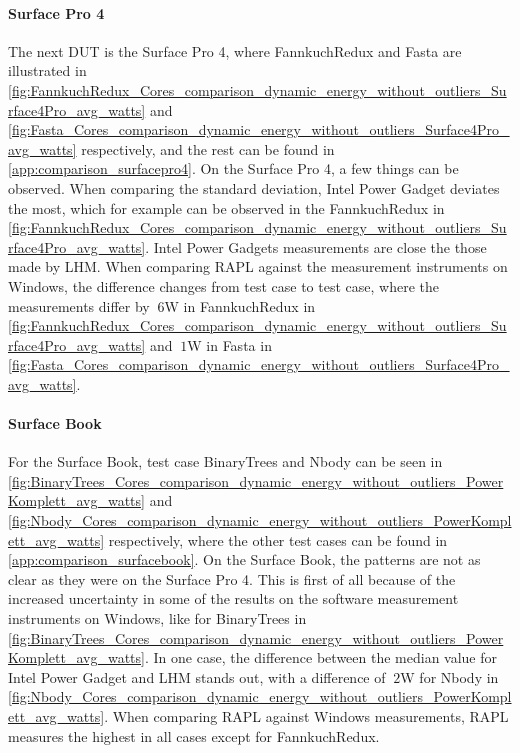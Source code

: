 \paragraph{Surface Pro 4}




The next DUT is the Surface Pro 4, where FannkuchRedux and Fasta are illustrated in \cref{fig:FannkuchRedux_Cores_comparison_dynamic_energy_without_outliers_Surface4Pro_avg_watts} and \cref{fig:Fasta_Cores_comparison_dynamic_energy_without_outliers_Surface4Pro_avg_watts} respectively, and the rest can be found in \cref{app:comparison_surfacepro4}. On the Surface Pro 4, a few things can be observed. When comparing the standard deviation, Intel Power Gadget deviates the most, which for example can be observed in the FannkuchRedux in \cref{fig:FannkuchRedux_Cores_comparison_dynamic_energy_without_outliers_Surface4Pro_avg_watts}. Intel Power Gadgets measurements are close the those made by LHM. When comparing RAPL against the measurement instruments on Windows, the difference changes from test case to test case,  where the measurements differ by $~6$W in FannkuchRedux in \cref{fig:FannkuchRedux_Cores_comparison_dynamic_energy_without_outliers_Surface4Pro_avg_watts} and $~1$W in Fasta in \cref{fig:Fasta_Cores_comparison_dynamic_energy_without_outliers_Surface4Pro_avg_watts}.

\paragraph{Surface Book}




For the Surface Book, test case BinaryTrees and Nbody can be seen in \cref{fig:BinaryTrees_Cores_comparison_dynamic_energy_without_outliers_PowerKomplett_avg_watts} and \cref{fig:Nbody_Cores_comparison_dynamic_energy_without_outliers_PowerKomplett_avg_watts} respectively, where the other test cases can be found in \cref{app:comparison_surfacebook}. On the Surface Book, the patterns are not as clear as they were on the Surface Pro 4. This is first of all because of the increased uncertainty in some of the results on the software measurement instruments on Windows, like for BinaryTrees in \cref{fig:BinaryTrees_Cores_comparison_dynamic_energy_without_outliers_PowerKomplett_avg_watts}. In one case, the difference between the median value for Intel Power Gadget and LHM stands out, with a difference of $~2$W for Nbody in \cref{fig:Nbody_Cores_comparison_dynamic_energy_without_outliers_PowerKomplett_avg_watts}. When comparing RAPL against Windows measurements, RAPL measures the highest in all cases except for FannkuchRedux.

